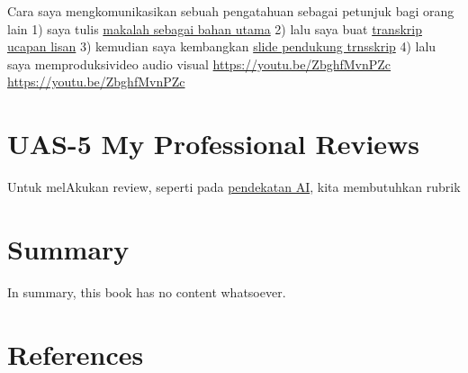 \documentclass[
  letterpaper,
  DIV=11,
  numbers=noendperiod]{scrreprt}
\begin{document}
Cara saya mengkomunikasikan sebuah pengatahuan sebagai petunjuk bagi
orang lain 1) saya tulis
\href{Rekomendasi\%20Presentasi\%20Efektif(Contoh\%20Makalah).pdf}{makalah
sebagai bahan utama} 2) lalu saya buat
\href{Contoh\%20Transkrip\%20Presentasi.pdf}{transkrip ucapan lisan} 3)
kemudian saya kembangkan
\href{Rekomendasi\%20Presentasi\%20(Contoh\%20Slides).pdf}{slide
pendukung trnsskrip} 4) lalu saya memproduksivideo audio visual
\url{https://youtu.be/ZbghfMvnPZc} \url{https://youtu.be/ZbghfMvnPZc}


\chapter{UAS-5 My Professional
Reviews}\label{uas-5-my-professional-reviews}

Untuk melAkukan review, seperti pada
\href{../My_Personal_Reviews/Doc.5.Mengevaluasi-Esai-Berdasarkan-Rubrik.pdf}{pendekatan
AI}, kita membutuhkan rubrik


\chapter{Summary}\label{summary}

In summary, this book has no content whatsoever.


\chapter*{References}\label{references}


\label{refs}
\end{document}
